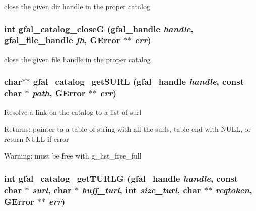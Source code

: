 close the given dir handle in the proper catalog 
\subsubsection{\setlength{\rightskip}{0pt plus 5cm}int gfal\_\-catalog\_\-close\-G (gfal\_\-handle {\em handle}, gfal\_\-file\_\-handle {\em fh}, GError $\ast$$\ast$ {\em err})}\label{gfal__common__catalog_8h_27712f4ef0fd4a8d3d5b63b90936d295}


close the given file handle in the proper catalog 
\subsubsection{\setlength{\rightskip}{0pt plus 5cm}char$\ast$$\ast$ gfal\_\-catalog\_\-get\-SURL (gfal\_\-handle {\em handle}, const char $\ast$ {\em path}, GError $\ast$$\ast$ {\em err})}\label{gfal__common__catalog_8h_eeef83dd1c788197ed7ae4a933d8e8d3}


Resolve a link on the catalog to a list of surl \begin{Desc}
\item[Returns:]pointer to a table of string with all the surls, table end with NULL, or return NULL if error \end{Desc}
\begin{Desc}
\item[Warning:]must be free with g\_\-list\_\-free\_\-full \end{Desc}
\subsubsection{\setlength{\rightskip}{0pt plus 5cm}int gfal\_\-catalog\_\-get\-TURLG (gfal\_\-handle {\em handle}, const char $\ast$ {\em surl}, char $\ast$ {\em buff\_\-turl}, int {\em size\_\-turl}, char $\ast$$\ast$ {\em reqtoken}, GError $\ast$$\ast$ {\em err})}\label{gfal__common__catalog_8h_6e670ae4258db2d05c8b5bc1c66f054a}



